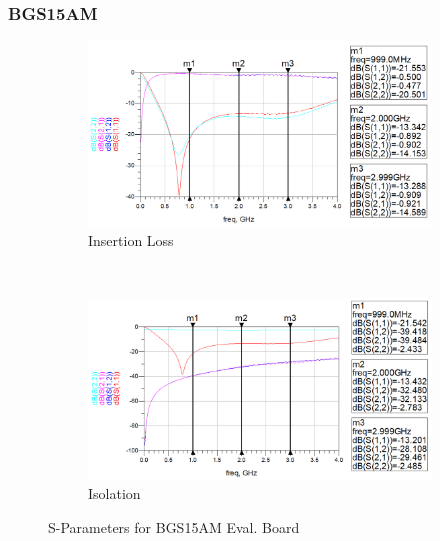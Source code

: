\documentclass[12pt,openany,a4paper]{book}
\begin{document}
\subsubsection{BGS15AM}
\begin{figure}[H]
    \centering
    \begin{subfigure}[t]{0.5\textwidth}
        \centering
        \includegraphics[width=1\textwidth]{eval-infineon-sp5t.png}
        \caption{Insertion Loss}
        \label{fig:eval-pe42441}
    \end{subfigure}%
    ~ 
    \begin{subfigure}[t]{0.5\textwidth}
        \centering
        \includegraphics[width=1\textwidth]{eval-infineon-sp5t-closed.png}
        \caption{Isolation}
    \end{subfigure}
    \caption{S-Parameters for BGS15AM Eval. Board}
\end{figure}
\end{document}
